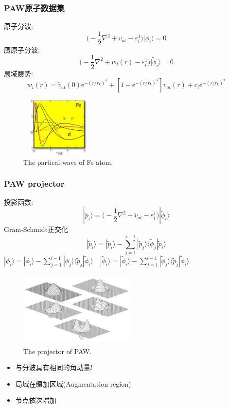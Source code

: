 \documentclass[cjk,slidestop,compress,mathserif,blue]{beamer}
\begin{document}
\frame
{
	\frametitle{\textrm{PAW}原子数据集}
	原子分波:$$\bigg(-\dfrac12\nabla^2+v_{at}-\varepsilon_i^1\bigg)|\phi_i\rangle=0$$
	赝原子分波:$$\bigg(-\dfrac12\nabla^2+w_i(r)-\varepsilon_i^1\bigg)|\tilde\phi_i\rangle=0$$
	局域赝势:%
	$$w_i(r)=\tilde v_{at}(0)\mathrm{e}^{-(r/r_k)^{\lambda}}+[1-\mathrm{e}^{-(r/r_k)^{\lambda}}]v_{at}(r)+c_i\mathrm{e}^{-(r/r_k)^{\lambda}}$$
\begin{figure}[h!]
\centering
\includegraphics[height=1.2in,width=1.5in,viewport=0 0 570 545,clip]{Figures/PAW-partical.png}
\caption{\small \textrm{The partical-wave of Fe atom.}}%
\label{PAW_partical_Fe}
\end{figure}
}

\frame
{
	\frametitle{\textrm{PAW projector}}
	投影函数:$$|\tilde p_i\rangle=\bigg(-\dfrac12\nabla^2+\tilde v_{at}-\varepsilon_i^1\bigg)|\tilde\phi_i\rangle$$
	\textrm{Gram-Schmidt}正交化
	$$|\tilde p_i\rangle=|\tilde p_i\rangle-\sum_{j=1}^{i-1}|\tilde p_j\rangle\langle\tilde\phi_j|\tilde p_i\rangle$$
	$|\phi_i\rangle=|\phi_i\rangle-\sum\limits_{j=1}^{i-1}|\phi_j\rangle\langle\tilde p_j|\tilde\phi_i\rangle\quad|\tilde\phi_i\rangle=|\tilde\phi_i\rangle-\sum\limits_{j=1}^{i-1}|\tilde\phi_j\rangle\langle\tilde p_j|\tilde\phi_i\rangle$
\begin{figure}[h!]
\centering
\vspace*{-0.4in}
\includegraphics[height=1.5in,width=2.3in,viewport=0 0 1100 745,clip]{Figures/PAW_projector-2.png}
\caption{\small \textrm{The projector of PAW.}}%
\label{PAW_projector}
\end{figure}
\begin{itemize}
	\item 与分波具有相同的角动量$l$
	\item 局域在缀加区域(Augmentation region)
	\item 节点依次增加
\end{itemize}
}
\end{document}
